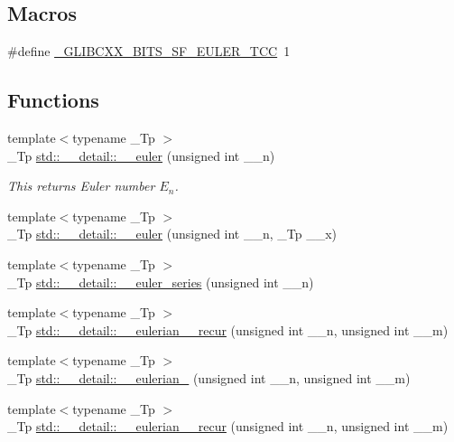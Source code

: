 \subsection*{Macros}
\begin{DoxyCompactItemize}
\item 
\#define \hyperlink{sf__euler_8tcc_a210115accb5094cbfd706ac2e4288414}{\+\_\+\+G\+L\+I\+B\+C\+X\+X\+\_\+\+B\+I\+T\+S\+\_\+\+S\+F\+\_\+\+E\+U\+L\+E\+R\+\_\+\+T\+CC}~1
\end{DoxyCompactItemize}
\subsection*{Functions}
\begin{DoxyCompactItemize}
\item 
{\footnotesize template$<$typename \+\_\+\+Tp $>$ }\\\+\_\+\+Tp \hyperlink{namespacestd_1_1____detail_a38f2ed4541c9876b8549c3917aad3b08}{std\+::\+\_\+\+\_\+detail\+::\+\_\+\+\_\+euler} (unsigned int \+\_\+\+\_\+n)
\begin{DoxyCompactList}\small\item\em This returns Euler number $ E_n $. \end{DoxyCompactList}\item 
{\footnotesize template$<$typename \+\_\+\+Tp $>$ }\\\+\_\+\+Tp \hyperlink{namespacestd_1_1____detail_aa44d18f565c3c36ba0351374dc4af09d}{std\+::\+\_\+\+\_\+detail\+::\+\_\+\+\_\+euler} (unsigned int \+\_\+\+\_\+n, \+\_\+\+Tp \+\_\+\+\_\+x)
\item 
{\footnotesize template$<$typename \+\_\+\+Tp $>$ }\\\+\_\+\+Tp \hyperlink{namespacestd_1_1____detail_a2e3eb67dee4d0b5c96824a4e8e9c227e}{std\+::\+\_\+\+\_\+detail\+::\+\_\+\+\_\+euler\+\_\+series} (unsigned int \+\_\+\+\_\+n)
\item 
{\footnotesize template$<$typename \+\_\+\+Tp $>$ }\\\+\_\+\+Tp \hyperlink{namespacestd_1_1____detail_afab99319465d188432fa8357d65129e0}{std\+::\+\_\+\+\_\+detail\+::\+\_\+\+\_\+eulerian\+\_\+\_\+recur} (unsigned int \+\_\+\+\_\+n, unsigned int \+\_\+\+\_\+m)
\item 
{\footnotesize template$<$typename \+\_\+\+Tp $>$ }\\\+\_\+\+Tp \hyperlink{namespacestd_1_1____detail_aa93423478ed5fd1fc260cc30466bef73}{std\+::\+\_\+\+\_\+detail\+::\+\_\+\+\_\+eulerian\+\_} (unsigned int \+\_\+\+\_\+n, unsigned int \+\_\+\+\_\+m)
\item 
{\footnotesize template$<$typename \+\_\+\+Tp $>$ }\\\+\_\+\+Tp \hyperlink{namespacestd_1_1____detail_a8a2a09c66c530759ae98ac1f3c1d93e5}{std\+::\+\_\+\+\_\+detail\+::\+\_\+\+\_\+eulerian\+\_\+\_\+recur} (unsigned int \+\_\+\+\_\+n, unsigned int \+\_\+\+\_\+m)
\end{DoxyCompactItemize}


